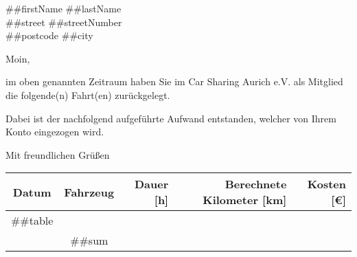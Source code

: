 \documentclass[
	pagenumber=false, %
	parskip=half, %
	fromalign=right, %
	foldmarks=true, %
	addrfield=true %
	firstfoot=on %
    ]{scrlttr2}
\date{ ##settlementDate } %
\begin{document}
 
\begin{letter}{ ##firstName ##lastName \\ ##street ##streetNumber\\ ##postcode ##city } %


\opening{Moin,}

im oben genannten Zeitraum haben Sie im Car Sharing Aurich e.V. als Mitglied die folgende(n) Fahrt(en) zurückgelegt.

Dabei ist der nachfolgend aufgeführte Aufwand entstanden, welcher von Ihrem Konto eingezogen wird.

\closing{Mit freundlichen Grüßen}





\begin{tabular}{ | c | c | r | r | r | }
\hline
Datum & Fahrzeug & Dauer [h] & Berechnete Kilometer [km]& Kosten [\euro{}]\\ \hline
##table\\
\hhline{|-|-|-|-|=|}
\multicolumn{4}{|r|}{Summe:} &##sum\\\hline
\end{tabular}

\end{letter}
\end{document}
